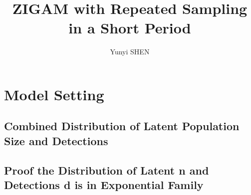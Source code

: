 \documentclass[]{article}
\title{ZIGAM with Repeated Sampling in a Short Period}
\author{Yunyi SHEN}
\begin{document}
\maketitle
\section{Model Setting}
\subsection{Combined Distribution of Latent Population Size and Detections}

\subsection{Proof the Distribution of Latent n and Detections d is in Exponential Family}
\end{document}
